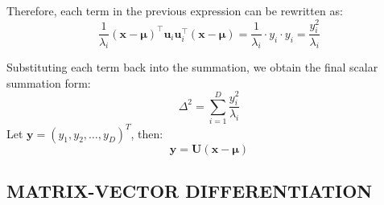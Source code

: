 \documentclass[../main.tex]{subfiles}
\begin{document}
Therefore, each term in the previous expression can be rewritten as:
$$
\frac{1}{\lambda_i} (\mathbf{x} - \boldsymbol{\mu})^\top \mathbf{u}_i \mathbf{u}_i^\top (\mathbf{x} - \boldsymbol{\mu}) = \frac{1}{\lambda_i} \cdot y_i \cdot y_i = \frac{y_i^2}{\lambda_i}
$$

Substituting each term back into the summation, we obtain the final scalar summation form:
$$
\Delta^2 = \sum_{i=1}^{D} \frac{y_i^2}{\lambda_i}
$$
Let $\boldsymbol{y}=(y_1,y_2,\dots, y_D)^T$, then:
$$
\boldsymbol{y}=\boldsymbol{U}(\boldsymbol{x}-\boldsymbol{\mu})
$$


\subsection{MATRIX-VECTOR DIFFERENTIATION}
\end{document}
